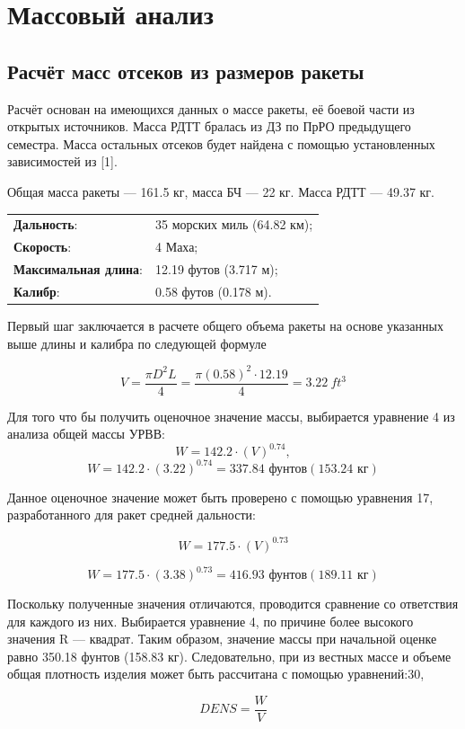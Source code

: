 \documentclass[a4paper,12pt]{report}
\begin{document}
\chapter{Массовый анализ}
\section{Расчёт масс отсеков из размеров ракеты}
Расчёт основан на имеющихся данных о массе ракеты, её боевой части из открытых источников. Масса РДТТ бралась из ДЗ по ПрРО предыдущего семестра. Масса остальных отсеков будет найдена
с помощью установленных зависимостей из [1].

Общая масса ракеты — 161.5 кг, масса БЧ — 22 кг. Масса РДТТ — 49.37 кг.

\begin{tabular}{ll}
    \textbf{Дальность}: & 35 морских миль (64.82 км); \\
    \textbf{Скорость}: & 4 Маха; \\
    \textbf{Максимальная длина}: & 12.19 футов (3.717 м); \\
    \textbf{Калибр}: & 0.58 футов (0.178 м).
\end{tabular}

Первый шаг заключается в расчете общего объема ракеты на основе
указанных выше длины и калибра по следующей формуле

\[V = \frac{\pi D^2 L}{4} = \frac{\pi (0.58)^2 \cdot 12.19}{4} = \SI{3.22}{ft^3}\]

Для того что
бы получить оценочное значение массы, выбирается уравнение 4 из анализа общей массы УРВВ:
\[W = 142.2\cdot(V)^{0.74},\]
\[W = 142.2 \cdot (3.22)^{0.74} = 337.84\text{ фунтов}(153.24\text{ кг})\] 

Данное оценочное значение может быть проверено с помощью уравнения 17, разработанного для ракет средней дальности:

\[ W = 177.5\cdot(V)^{0.73} \]

\[ W = 177.5\cdot(3.38)^{0.73} = 416.93 \text{ фунтов}(189.11\text{ кг}) \]

 Поскольку полученные значения отличаются, проводится сравнение со
ответствия для каждого из них. Выбирается уравнение 4, по причине более высокого значения R — квадрат. Таким образом, значение массы при
 начальной оценке равно 350.18 фунтов (158.83 кг). Следовательно, при из
вестных массе и объеме общая плотность изделия может быть рассчитана
 с помощью уравнений:30,


\[ \textit{DENS} = \frac{\textit{W}}{\textit{V}} \]
\end{document}

